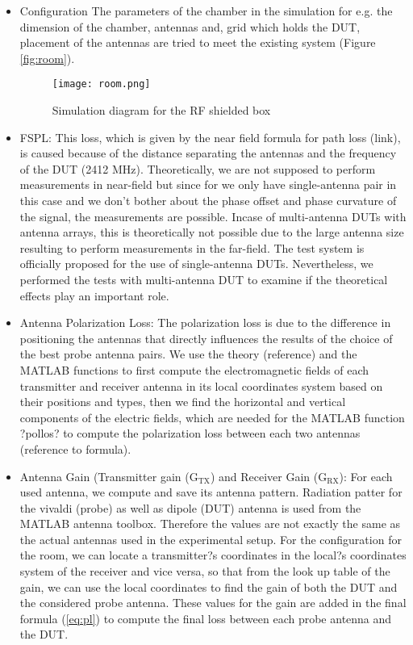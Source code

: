 \begin{itemize}
  \item Configuration
  \noindent The parameters of the chamber in the simulation for e.g. the dimension of the chamber, antennas and, grid which holds the DUT, placement of the antennas are tried to meet the existing system (Figure \ref{fig:room}). 
  \begin{figure}[H]
\centering
\texttt{[image: room.png]}
\caption{Simulation diagram for the RF shielded box}
\label{fig:lroom} 
\end{figure}

  \item \acf{FSPL}: This loss, which is given by the near field formula for path loss (link), is caused because of the distance separating the antennas and the frequency of the \acs{DUT} (2412 MHz). Theoretically, we are not supposed to perform measurements in near-field but since for we only have single-antenna pair in this case and we don't bother about the phase offset and phase curvature of the signal, the measurements are possible. Incase of multi-antenna \acsp{DUT} with antenna arrays, this is theoretically not possible due to the large antenna size resulting to perform measurements in the far-field. The test system is officially proposed for the use of single-antenna \acsp{DUT}. Nevertheless, we performed the tests with multi-antenna \acs{DUT} to examine if the theoretical effects play an important role.
 
  \item Antenna Polarization Loss: The polarization loss is due to the difference in positioning the antennas that directly influences the results of the choice of the best probe antenna pairs. We use the theory (reference) and the MATLAB\textregistered{} functions to first compute the electromagnetic fields of each transmitter and receiver antenna in its local coordinates system based on their positions and types, then we find the horizontal and vertical components of the electric fields, which are needed for the MATLAB\textregistered{} function ?pollos? to compute the polarization loss between each two antennas (reference to formula).
  
  \item Antenna Gain (Transmitter gain ($\mbox{G}_{\mbox{TX}}$) and Receiver Gain ($\mbox{G}_{\mbox{RX}}$): For each used antenna, we compute and save its antenna pattern. Radiation patter for the vivaldi (probe) as well as dipole (\acs{DUT}) antenna is used from the MATLAB\textregistered{} antenna toolbox. Therefore the values are not exactly the same as the actual antennas used in the experimental setup. For the configuration for the room, we can locate a transmitter?s coordinates in the local?s coordinates system of the receiver and vice versa, so that from the look up table of the gain, we can use the local coordinates to find the gain of both the \acs{DUT} and the considered probe antenna. These values for the gain are added in the final formula  (\ref{eq:pl}) to compute the final loss between each probe antenna and the \acs{DUT}.
  

\end{itemize}
